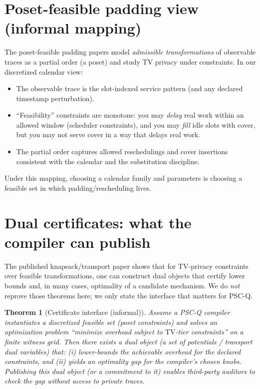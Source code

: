 \documentclass[11pt]{article}
\newtheorem{theorem}{Theorem}
\theoremstyle{definition}
\theoremstyle{remark}
\newcommand{\TV}{\mathrm{TV}}
\begin{document}
\section{Poset-feasible padding view (informal mapping)}
The poset-feasible padding papers model \emph{admissible transformations} of observable traces as a partial order (a poset) and study TV privacy under constraints.
In our discretized calendar view:
\begin{itemize}[leftmargin=1.2em]
\item The observable trace is the slot-indexed service pattern (and any declared timestamp perturbation).
\item ``Feasibility'' constraints are monotone: you may \emph{delay} real work within an allowed window (scheduler constraints), and you may \emph{fill} idle slots with cover, but you may not serve cover in a way that delays real work.
\item The partial order captures allowed reschedulings and cover insertions consistent with the calendar and the substitution discipline.
\end{itemize}
Under this mapping, choosing a calendar family and parameters is choosing a feasible set in which padding/rescheduling lives.

\section{Dual certificates: what the compiler can publish}
The published knapsack/transport paper shows that for TV-privacy constraints over feasible transformations, one can construct dual objects
that certify lower bounds and, in many cases, optimality of a candidate mechanism.
We do \emph{not} reprove those theorems here; we only state the interface that matters for PSC-Q.

\begin{theorem}[Certificate interface (informal)]
Assume a PSC-Q compiler instantiates a discretized feasible set (poset constraints) and solves an optimization problem
``minimize overhead subject to $\TV$-tier constraints'' on a finite witness grid.
Then there exists a dual object (a set of potentials / transport dual variables) that:
(i) lower-bounds the achievable overhead for the declared constraints, and
(ii) yields an optimality gap for the compiler's chosen knobs.
Publishing this dual object (or a commitment to it) enables third-party auditors to check the gap without access to private traces.
\end{theorem}
\end{document}
